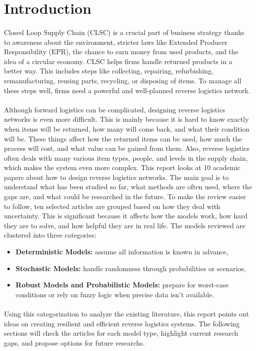 \section{Introduction}

\paragraph{} Closed Loop Supply Chain (CLSC) is a crucial part of business strategy thanks to awareness about the environment, stricter laws like Extended Producer Responsibility (EPR), the chance to earn money from used products, and the idea of a circular economy. CLSC helps firms handle returned products in a better way. This includes steps like collecting, repairing, refurbishing, remanufacturing, reusing parts, recycling, or disposing of items. To manage all these steps well, firms need a powerful and well-planned reverse logistics network.

\paragraph{} Although forward logistics can be complicated, designing reverse logistics networks is even more difficult. This is mainly because it is hard to know exactly when items will be returned, how many will come back, and what their condition will be. These things affect how the returned items can be used, how much the process will cost, and what value can be gained from them. Also, reverse logistics often deals with many various item types, people, and levels in the supply chain, which makes the system even more complex.
This report looks at 10 academic papers about how to design reverse logistics networks. The main goal is to understand what has been studied so far, what methods are often used, where the gaps are, and what could be researched in the future. To make the review easier to follow, ten selected articles are grouped based on how they deal with uncertainty. This is significant because it affects how the models work, how hard they are to solve, and how helpful they are in real life.
The models reviewed are clustered into three categories:
\begin{itemize}[label=, leftmargin=2mm]
    \item \textbf{Deterministic Models:} assume all information is known in advance,
    \item \textbf{Stochastic Models:} handle randomness through probabilities or scenarios,
    \item \textbf{Robust Models and Probabilistic Models:} prepare for worst-case conditions or rely on fuzzy logic when precise data isn't available.
\end{itemize}

\paragraph{} Using this categorization to analyze the existing literature, this report points out ideas on creating resilient and efficient reverse logistics systems. The following sections will check the articles for each model type, highlight current research gaps, and propose options for future researchs.
